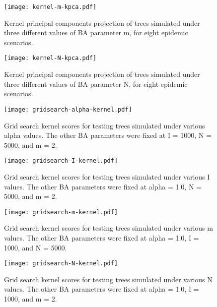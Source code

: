 \begin{figure}[ht]
  \centering
  \texttt{[image: kernel-m-kpca.pdf]}
  \caption{
    Kernel principal components projection of trees simulated under three
    different values of \gls{BA} parameter \gls{m}, for eight epidemic
    scenarios.
  }
  \label{fig:mkpca}
\end{figure}

\begin{figure}[ht]
  \centering
  \texttt{[image: kernel-N-kpca.pdf]}
  \caption{
    Kernel principal components projection of trees simulated under three
    different values of \gls{BA} parameter \gls{N}, for eight epidemic
    scenarios.
  }
  \label{fig:Nkpca}
\end{figure}

\clearpage

\begin{figure}[ht]
  \centering
  \texttt{[image: gridsearch-alpha-kernel.pdf]}
  \caption{                                              
    Grid search kernel scores for testing trees simulated under various             
    \gls{alpha} values. The other \gls{BA} parameters were fixed at \gls{I} =
    1000, \gls{N} = 5000, and \gls{m} = 2. 
  }        
  \label{fig:gridalpha}
\end{figure}

\begin{figure}[ht]
  \centering
  \texttt{[image: gridsearch-I-kernel.pdf]}
  \caption{                                              
    Grid search kernel scores for testing trees simulated under various             
    \gls{I} values. The other \gls{BA} parameters were fixed at \gls{alpha} =
    1.0, \gls{N} = 5000, and \gls{m} = 2. 
  }        
  \label{fig:gridI}
\end{figure}

\begin{figure}[ht]
  \centering
  \texttt{[image: gridsearch-m-kernel.pdf]}
  \caption{                                              
    Grid search kernel scores for testing trees simulated under various             
    \gls{m} values. The other \gls{BA} parameters were fixed at \gls{alpha} =
    1.0, \gls{I} = 1000, and \gls{N} = 5000.
  }        
  \label{fig:gridm}
\end{figure}

\begin{figure}[ht]
  \centering
  \texttt{[image: gridsearch-N-kernel.pdf]}
  \caption{                                              
    Grid search kernel scores for testing trees simulated under various             
    \gls{N} values. The other \gls{BA} parameters were fixed at \gls{alpha} =
    1.0, \gls{I} = 1000, and \gls{m} = 2.
  }        
  \label{fig:gridN}
\end{figure}

